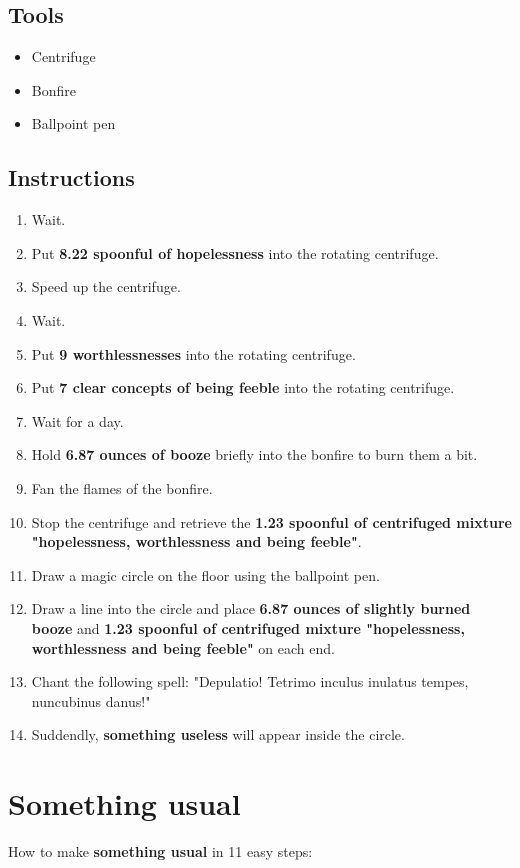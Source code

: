 \documentclass{article}
\begin{document}
\subsection{Tools}\begin{itemize}
\item 
Centrifuge
\item 
Bonfire
\item 
Ballpoint pen
\end{itemize}
\subsection{Instructions}\begin{enumerate}
\item 
Wait.
\item 
Put \textbf{8.22 spoonful of hopelessness} into the rotating centrifuge.
\item 
Speed up the centrifuge.
\item 
Wait.
\item 
Put \textbf{9 worthlessnesses} into the rotating centrifuge.
\item 
Put \textbf{7 clear concepts of being feeble} into the rotating centrifuge.
\item 
Wait for a day.
\item 
Hold \textbf{6.87 ounces of booze} briefly into the bonfire to burn them a bit.
\item 
Fan the flames of the bonfire.
\item 
Stop the centrifuge and retrieve the \textbf{1.23 spoonful of centrifuged mixture "hopelessness, worthlessness and being feeble"}.
\item 
Draw a magic circle on the floor using the ballpoint pen.
\item 
Draw a line into the circle and place \textbf{6.87 ounces of slightly burned booze} and \textbf{1.23 spoonful of centrifuged mixture "hopelessness, worthlessness and being feeble"} on each end.
\item 
Chant the following spell: "Depulatio! Tetrimo inculus inulatus tempes, nuncubinus danus!"
\item 
Suddendly, \textbf{something useless} will appear inside the circle.
\end{enumerate}
\newpage
\section{Something usual}How to make \textbf{something usual} in 11 easy steps:
\end{document}
